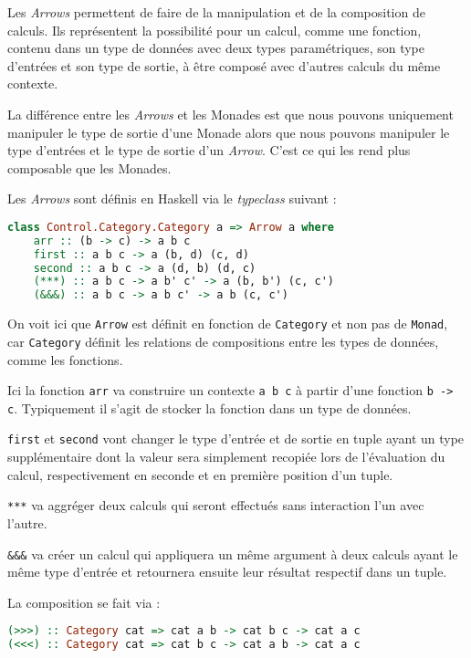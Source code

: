 \documentclass{llncs}
\begin{document}
Les \emph{Arrows} permettent de faire de la manipulation et de la composition de calculs.
Ils représentent la possibilité pour un calcul, comme une fonction, contenu dans un
type de données avec deux types paramétriques, son type d'entrées et son type de sortie,
à être composé avec d'autres calculs du même contexte.

La différence entre les \emph{Arrows} et les Monades est que nous pouvons
uniquement manipuler le type de sortie d'une Monade alors que nous pouvons
manipuler le type d'entrées et le type de sortie d'un \emph{Arrow}.
C'est ce qui les rend plus composable que les Monades.

Les \emph{Arrows} sont définis en Haskell via le \emph{typeclass} suivant :
\begin{lstlisting}[language=haskell]
class Control.Category.Category a => Arrow a where
    arr :: (b -> c) -> a b c
    first :: a b c -> a (b, d) (c, d)
    second :: a b c -> a (d, b) (d, c)
    (***) :: a b c -> a b' c' -> a (b, b') (c, c')
    (&&&) :: a b c -> a b c' -> a b (c, c')
\end{lstlisting}

On voit ici que \texttt{Arrow} est définit en fonction de \texttt{Category} et non pas
de \texttt{Monad}, car \texttt{Category} définit les relations de compositions entre
les types de données, comme les fonctions.

Ici la fonction \texttt{arr} va construire un contexte \texttt{a b c} à partir d'une
fonction \texttt{b -> c}.
Typiquement il s'agit de stocker la fonction dans un type de données.

\texttt{first} et \texttt{second} vont changer le type d'entrée et de sortie
en tuple ayant un type supplémentaire dont la valeur sera simplement recopiée
lors de l'évaluation du calcul, respectivement en seconde et en première position
d'un tuple.

\texttt{***} va aggréger deux calculs qui seront effectués sans interaction l'un
avec l'autre.

\texttt{\&\&\&} va créer un calcul qui appliquera un même argument à deux calculs ayant
le même type d'entrée et retournera ensuite leur résultat respectif dans un tuple.

La composition se fait via :
\begin{lstlisting}[language=haskell]
(>>>) :: Category cat => cat a b -> cat b c -> cat a c
(<<<) :: Category cat => cat b c -> cat a b -> cat a c
\end{lstlisting}
\end{document}

